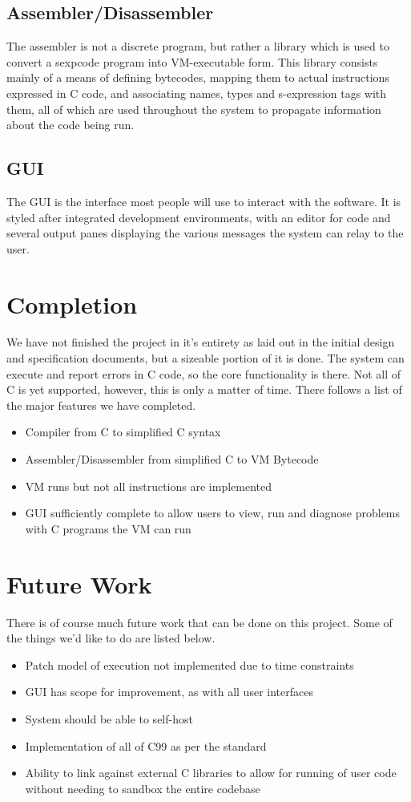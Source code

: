 \documentclass[10pt,a4paper]{report}
\begin{document}
\subsection{Assembler/Disassembler}
The assembler is not a discrete program, but rather a library which is used to convert a sexpcode program into VM-executable form. This library consists mainly of a means of defining bytecodes, mapping them to actual instructions expressed in C code, and associating names, types and s-expression tags with them, all of which are used throughout the system to propagate information about the code being run.

\subsection{GUI}
The GUI is the interface most people will use to interact with the software. It is styled after integrated development environments, with an editor for code and several output panes displaying the various messages the system can relay to the user.

\section{Completion}
We have not finished the project in it's entirety as laid out in the initial design and specification documents, but a sizeable portion of it is done. The system can execute and report errors in C code, so the core functionality is there. Not all of C is yet supported, however, this is only a matter of time. There follows a list of the major features we have completed.
\begin{itemize}
\item Compiler from C to simplified C syntax
\item Assembler/Disassembler from simplified C to VM Bytecode
\item VM runs but not all instructions are implemented
\item GUI sufficiently complete to allow users to view, run and diagnose problems with C programs the VM can run
\end{itemize}

\section{Future Work}
There is of course much future work that can be done on this project. Some of the things we'd like to do are listed below.
\begin{itemize}
\item Patch model of execution not implemented due to time constraints
\item GUI has scope for improvement, as with all user interfaces
\item System should be able to self-host
\item Implementation of all of C99 as per the standard
\item Ability to link against external C libraries to allow for running of user code without needing to sandbox the entire codebase
\end{itemize}
\end{document}
